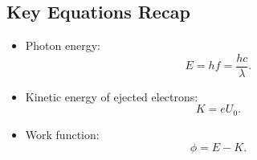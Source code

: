 \documentclass[a4paper,12pt]{article}
\begin{document}
\begin{multicols}{2}
\section*{Key Equations Recap}
\begin{itemize}
    \item Photon energy: 
    \[
    E = hf = \frac{hc}{\lambda}.
    \]
    \item Kinetic energy of ejected electrons:
    \[
    K = eU_0.
    \]
    \item Work function:
    \[
    \phi = E - K.
    \]
\end{itemize}

\end{multicols}
\end{document}
